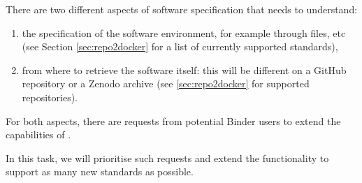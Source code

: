 \begin{task}[
  title=Support more software specification standards,
  id=buildpacks,
  lead=SRL,
  PM=12,
  partners={MP}
  ]

  There are two different aspects of software specification that \repotodocker{}
  needs to understand:
  \begin{enumerate}
  \item the specification of the software environment, for example through
     files, etc (see Section
    \ref{sec:repo2docker} for a list of currently
    supported standards),
  \item from where to retrieve the software itself: this will be different on a
    GitHub repository or a Zenodo archive
    (see \ref{sec:repo2docker} for supported repositories).
  \end{enumerate}

  For both aspects, there are requests from potential Binder users to extend the
  capabilities of \repotodocker{}.

  In this task, we will prioritise such requests and extend the \repotodocker{}
  functionality to support as many new standards as possible.

\end{task}
